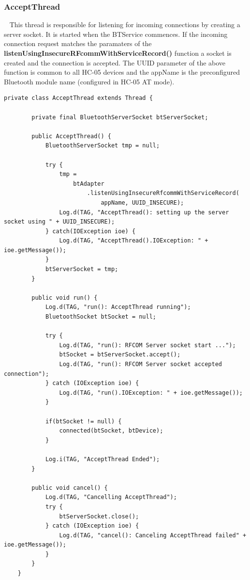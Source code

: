 \documentclass[12pt,a4paper]{article}
\begin{document}
    \subsubsection*{AcceptThread}~\cite{bib:acceptThread}
    This thread is responsible for listening for incoming connections by creating a server socket. It is started when the BTService commences. If the incoming connection request matches the paramaters of the {\bfseries listenUsingInsecureRFcommWithServiceRecord()} function a socket is created and the connection is accepted. The UUID parameter of the above function is common to all HC-05 devices and the appName is the preconfigured Bluetooth module name (configured in HC-05 AT mode).
    
   \begin{lstlisting}[label={lst:acceptThread}, caption=AcceptThread class]
    private class AcceptThread extends Thread {

        private final BluetoothServerSocket btServerSocket;

        public AcceptThread() {
            BluetoothServerSocket tmp = null;

            try {
                tmp = 
                    btAdapter
                        .listenUsingInsecureRfcommWithServiceRecord(
                            appName, UUID_INSECURE);
                Log.d(TAG, "AcceptThread(): setting up the server socket using " + UUID_INSECURE);
            } catch(IOException ioe) {
                Log.d(TAG, "AcceptThread().IOException: " + ioe.getMessage());
            }
            btServerSocket = tmp;
        }

        public void run() {
            Log.d(TAG, "run(): AcceptThread running");
            BluetoothSocket btSocket = null;

            try {
                Log.d(TAG, "run(): RFCOM Server socket start ...");
                btSocket = btServerSocket.accept();
                Log.d(TAG, "run(): RFCOM Server socket accepted connection");
            } catch (IOException ioe) {
                Log.d(TAG, "run().IOException: " + ioe.getMessage());
            }

            if(btSocket != null) {
                connected(btSocket, btDevice);
            }

            Log.i(TAG, "AcceptThread Ended");
        }

        public void cancel() {
            Log.d(TAG, "Cancelling AcceptThread");
            try {
                btServerSocket.close();
            } catch (IOException ioe) {
                Log.d(TAG, "cancel(): Canceling AcceptThread failed" + ioe.getMessage());
            }
        }
    }
    \end{lstlisting}
    
\end{document}
